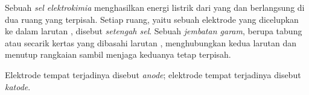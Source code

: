 \begin{definition}\label{def:g12:cells-and-electrolysis:cell}
Sebuah \emph{sel elektrokimia} menghasilkan
energi listrik dari  yang  dan 
berlangsung di dua ruang yang terpisah. Setiap ruang, yaitu sebuah
elektrode  yang dicelupkan ke dalam larutan , disebut
\emph{setengah sel}. Sebuah
\emph{jembatan garam}, berupa tabung atau
secarik kertas yang dibasahi larutan , menghubungkan kedua larutan
dan menutup rangkaian sambil menjaga keduanya tetap terpisah.
\end{definition}

\begin{definition}\label{def:g12:cells-and-electrolysis:anode}
Elektrode tempat terjadinya  disebut \emph{anode};
elektrode tempat terjadinya  disebut
\emph{katode}.
\end{definition}

